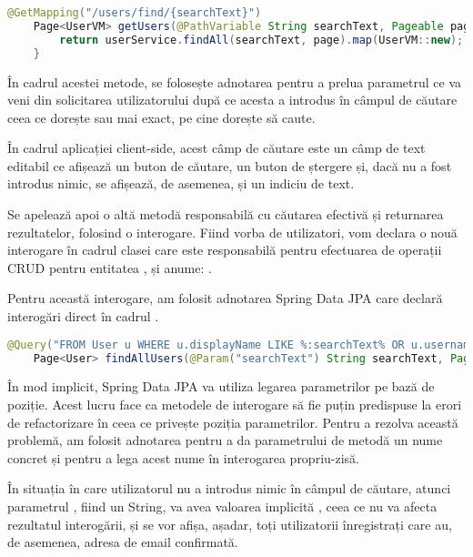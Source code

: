 \begin{lstlisting}[language=Java]
	@GetMapping("/users/find/{searchText}")
	Page<UserVM> getUsers(@PathVariable String searchText, Pageable page) {
		return userService.findAll(searchText, page).map(UserVM::new);
	}
\end{lstlisting}
\bigskip

În cadrul acestei metode, se folosește adnotarea  pentru a prelua parametrul ce va veni din solicitarea utilizatorului după ce acesta a introdus în câmpul de căutare ceea ce dorește sau mai exact, pe cine dorește să caute.\newline

În cadrul aplicației client-side, acest câmp de căutare este un câmp de text editabil ce afișează un buton de căutare, un buton de ștergere și, dacă nu a fost introdus nimic, se afișează, de asemenea, și un indiciu de text.\newline

Se apelează apoi o altă metodă responsabilă cu căutarea efectivă și returnarea rezultatelor, folosind o interogare. Fiind vorba de utilizatori, vom declara o nouă interogare în cadrul clasei care este responsabilă pentru efectuarea de operații CRUD pentru entitatea , și anume: .\newline

Pentru această interogare, am folosit adnotarea Spring Data JPA \cite{.springjpabook} care declară interogări direct în cadrul .\newline

\begin{lstlisting}[language=Java]
	@Query("FROM User u WHERE u.displayName LIKE %:searchText% OR u.username LIKE %:searchText% ORDER BY u.username, u.displayName ASC")
	Page<User> findAllUsers(@Param("searchText") String searchText, Pageable page);
\end{lstlisting}
\bigskip

În mod implicit, Spring Data JPA va utiliza legarea parametrilor pe bază de poziție. Acest lucru face ca metodele de interogare să fie puțin predispuse la erori de refactorizare în ceea ce privește poziția parametrilor. Pentru a rezolva această problemă, am folosit adnotarea  pentru a da parametrului de metodă  un nume concret și pentru a lega acest nume în interogarea propriu-zisă.\newline

În situația în care utilizatorul nu a introdus nimic în câmpul de căutare, atunci parametrul , fiind un String, va avea valoarea implicită , ceea ce nu va afecta rezultatul interogării, și se vor afișa, așadar, toți utilizatorii înregistrați care au, de asemenea, adresa de email confirmată.\newline

